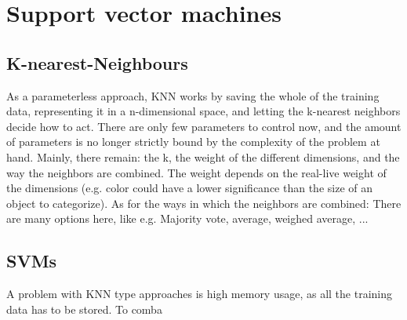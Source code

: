 \section{Support vector machines}
\label{sec:SVM}
\subsection{K-nearest-Neighbours}
As a parameterless approach, KNN works by saving the whole of the training data, representing it in a n-dimensional space, and letting the k-nearest neighbors decide how to act. There are only few parameters to control now, and the amount of parameters is no longer strictly bound by the complexity of the problem at hand. Mainly, there remain: the k, the weight of the different dimensions, and the way the neighbors are combined. 
The weight depends on the real-live weight of the dimensions (e.g. color could have a lower significance than the size of an object to categorize).
As for the ways in which the neighbors are combined: There are many options here, like e.g. Majority vote, average, weighed average, ...
\subsection{SVMs}
A problem with KNN type approaches is high memory usage, as all the training data has to be stored. To comba